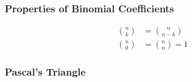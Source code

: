 \subsubsection{Properties of Binomial Coefficients}

\begin{equation*}
    \begin{aligned}
        \binom{n}{k} & = \binom{n}{n - k} \\
        \binom{n}{0} &= \binom{n}{n}  = 1 
    \end{aligned}
\end{equation*}

\subsubsection{Pascal's Triangle}


